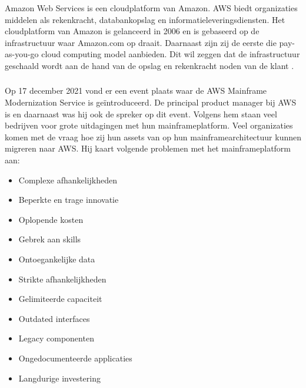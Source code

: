 Amazon Web Services is een cloudplatform van Amazon. AWS biedt organizaties middelen als rekenkracht, databankopslag en informatieleveringsdiensten. Het cloudplatform van Amazon is gelanceerd in 2006 en is gebaseerd op de infrastructuur waar Amazon.com op draait. Daarnaast zijn zij de eerste die pay-as-you-go cloud computing model aanbieden. Dit wil zeggen dat de infrastructuur geschaald wordt aan de hand van de opslag en rekenkracht noden van de klant \autocite{Gillis2020}.

\subsubsection{}
\label{sec:AWS Mainframe Modernization Service }

Op 17 december 2021 vond er een event plaats waar de AWS Mainframe Modernization Service is geïntroduceerd. De principal product manager bij AWS is \textcite{Valence2021}  en daarnaast was hij ook de spreker op dit event. Volgens hem staan veel bedrijven voor grote uitdagingen met hun mainframeplatform. Veel organizaties komen met de vraag hoe zij hun assets van op hun mainframearchitectuur kunnen migreren naar AWS. Hij kaart volgende problemen met het mainframeplatform aan: 
 \begin{itemize}
    \item Complexe afhankelijkheden
    \item Beperkte en trage innovatie
    \item Oplopende kosten
    \item Gebrek aan skills
    \item Ontoegankelijke data
    \item Strikte afhankelijkheden
    \item Gelimiteerde capaciteit
    \item Outdated interfaces 
    \item Legacy componenten
    \item Ongedocumenteerde applicaties 
    \item Langdurige investering 
\end{itemize}

